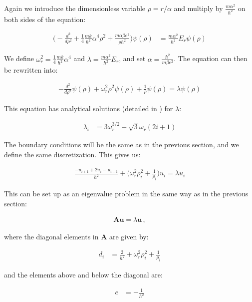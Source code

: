 \documentclass[reprint,english,notitlepage]{revtex4-1}  %
\begin{document}
Again we introduce the dimensionless variable $\rho = r/\alpha$ and multiply by $\frac{m\alpha^2}{\hbar^2}$ on both sides of the equation:

\begin{align*}
\bigg( - \frac{d^2}{d\rho^2} + \frac{1}{4} \frac{mk}{\hbar^2} \alpha^4 \rho^2 + \frac{m\alpha \beta e^2}{\rho \hbar^2} \bigg) \psi (\rho) &= \frac{m\alpha^2}{\hbar^2} E_r \psi(\rho)
\end{align*}

We define $\omega_r^2 = \frac{1}{4} \frac{mk}{\hbar^2} \alpha^4$ and $\lambda = \frac{m\alpha^2}{\hbar^2}E_r$, and set $\alpha = \frac{\hbar^2}{m\beta e^2}$. The equation can then be rewritten into:

\begin{align*}
- \frac{d^2}{d\rho^2} \psi(\rho) + \omega_r^2 \rho^2 \psi(\rho) + \frac{1}{\rho} \psi(\rho) = \lambda \psi(\rho)
\end{align*}

This equation has analytical solutions (detailed in \citep{PhysRevA.48.3561}) for $\lambda$:

\begin{align*}
\lambda_i &= 3 \omega_r^{3/2} +\sqrt{3} \omega_r (2i + 1)
\end{align*}

The boundary conditions will be the same as in the previous section, and we define the same discretization. This gives us:

\begin{align*}
\frac{-u_{i+1} + 2u_i - u_{i-1}}{h^2} + \bigg( \omega_r^2\rho_i^2 + \frac{1}{\rho_i} \bigg) u_i = \lambda u_i
\end{align*}

This can be set up as an eigenvalue problem in the same way as in the previous section:

\begin{align*}
\textbf{Au} = \lambda \textbf{u} \, ,
\end{align*}

where the diagonal elements in \textbf{A} are given by:

\begin{align*}
d_i &= \frac{2}{h^2} + \omega_r^2 \rho_i^2 + \frac{1}{\rho_i}
\end{align*}

and the elements above and below the diagonal are:

\begin{align*}
e &= - \frac{1}{h^2}
\end{align*}
\end{document}
